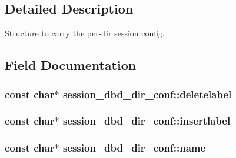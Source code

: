 \subsection{Detailed Description}
Structure to carry the per-\/dir session config. 

\subsection{Field Documentation}
\subsubsection[{\texorpdfstring{deletelabel}{deletelabel}}]{\setlength{\rightskip}{0pt plus 5cm}const char$\ast$ session\+\_\+dbd\+\_\+dir\+\_\+conf\+::deletelabel}\hypertarget{structsession__dbd__dir__conf_a74585949dda3c955c115f8731bdda50e}{}\label{structsession__dbd__dir__conf_a74585949dda3c955c115f8731bdda50e}
\subsubsection[{\texorpdfstring{insertlabel}{insertlabel}}]{\setlength{\rightskip}{0pt plus 5cm}const char$\ast$ session\+\_\+dbd\+\_\+dir\+\_\+conf\+::insertlabel}\hypertarget{structsession__dbd__dir__conf_a334c550f7fbc8e4f2892f4c8fcdf2f2b}{}\label{structsession__dbd__dir__conf_a334c550f7fbc8e4f2892f4c8fcdf2f2b}
\subsubsection[{\texorpdfstring{name}{name}}]{\setlength{\rightskip}{0pt plus 5cm}const char$\ast$ session\+\_\+dbd\+\_\+dir\+\_\+conf\+::name}\hypertarget{structsession__dbd__dir__conf_a68770a084db844dcde28e8bca6ae5ac1}{}\label{structsession__dbd__dir__conf_a68770a084db844dcde28e8bca6ae5ac1}
